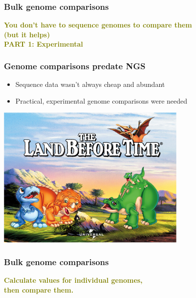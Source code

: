 
%
\begin{frame}
  \frametitle{Bulk genome comparisons}
  \Large{
    \textcolor{olive}{
      \textbf{
      You don't have to sequence genomes to compare them \\
      (but it helps) \\
      PART 1: Experimental
      }
    }
  }
\end{frame}

%
\begin{frame}
  \frametitle{Genome comparisons predate NGS}
  \begin{itemize}
    \item Sequence data wasn't always cheap and abundant
    \item Practical, experimental genome comparisons were needed
  \end{itemize}
  \begin{center}
    \includegraphics[width=0.7\textwidth]{images/land_before_time}
  \end{center}  
\end{frame}

%
\begin{frame}
  \frametitle{Bulk genome comparisons}
  \Large{
    \textcolor{olive}{
      \textbf{
      Calculate values for individual genomes, \\
      then compare them.
      }
    }
  }
\end{frame}

